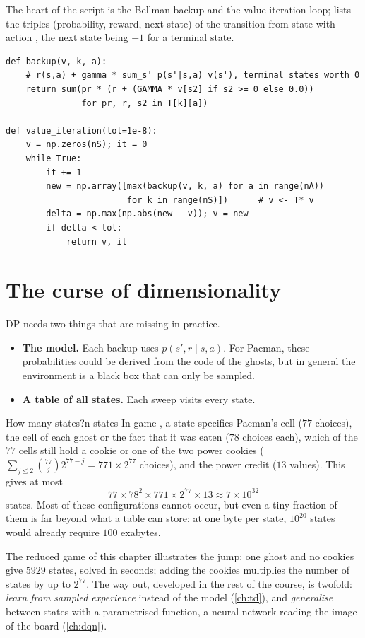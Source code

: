 The heart of the script is the Bellman backup and the value iteration
loop;  lists the triples (probability, reward, next state) of
the transition from state  with action , the next state
being $-1$ for a terminal state.
\begin{lstlisting}[caption={Value iteration (\code{Course/code/dp\_escape.py},
  excerpt)}]
def backup(v, k, a):
    # r(s,a) + gamma * sum_s' p(s'|s,a) v(s'), terminal states worth 0
    return sum(pr * (r + (GAMMA * v[s2] if s2 >= 0 else 0.0))
               for pr, r, s2 in T[k][a])

def value_iteration(tol=1e-8):
    v = np.zeros(nS); it = 0
    while True:
        it += 1
        new = np.array([max(backup(v, k, a) for a in range(nA))
                        for k in range(nS)])      # v <- T* v
        delta = np.max(np.abs(new - v)); v = new
        if delta < tol:
            return v, it
\end{lstlisting}

\section{The curse of dimensionality}
\label{sec:curse}

DP needs two things that are missing in practice.
\begin{itemize}
  \item \textbf{The model.} Each backup uses $p(s', r \mid s, a)$. For
    Pacman, these probabilities could be derived from the code of the
    ghosts, but in general the environment is a black box that can only be
    sampled.
  \item \textbf{A table of all states.} Each sweep visits every state.
\end{itemize}

\begin{pacman}{How many states?}{n-states}
  In game , a state specifies Pacman's cell ($77$ choices), the
  cell of each ghost or the fact that it was eaten ($78$ choices each),
  which of the $77$ cells still hold a cookie or one of the two power
  cookies ($\sum_{j \le 2} \binom{77}{j} 2^{77 - j} = 771 \times 2^{77}$
  choices), and the power credit ($13$ values). This gives at most
  \begin{equation*}
    77 \times 78^2 \times 771 \times 2^{77} \times 13 \approx 7 \times 10^{32}
  \end{equation*}
  states. Most of these configurations cannot occur, but even a tiny
  fraction of them is far beyond what a table can store: at one byte per
  state, $10^{20}$ states would already require $100$ exabytes.
\end{pacman}

The reduced game of this chapter illustrates the jump: one ghost and no
cookies give $5929$ states, solved in seconds; adding the cookies
multiplies the number of states by up to $2^{77}$. The way out, developed in
the rest of the course, is twofold: \emph{learn from sampled experience}
instead of the model (\cref{ch:td}), and \emph{generalise} between states
with a parametrised function, a neural network reading the image of the
board (\cref{ch:dqn}).
